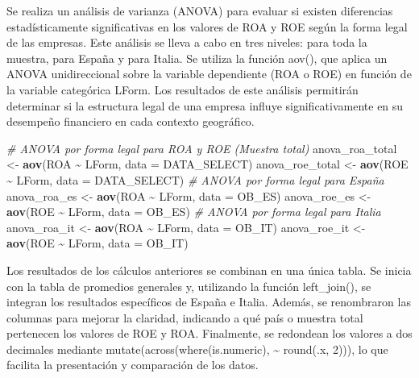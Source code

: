 \documentclass[
]{article}
\newenvironment{Shaded}{\begin{snugshade}}{\end{snugshade}}
\newcommand{\AttributeTok}[1]{\textcolor[rgb]{0.13,0.29,0.53}{#1}}
\newcommand{\CommentTok}[1]{\textcolor[rgb]{0.56,0.35,0.01}{\textit{#1}}}
\newcommand{\FunctionTok}[1]{\textcolor[rgb]{0.13,0.29,0.53}{\textbf{#1}}}
\newcommand{\NormalTok}[1]{#1}
\newcommand{\OtherTok}[1]{\textcolor[rgb]{0.56,0.35,0.01}{#1}}
\newcommand{\SpecialCharTok}[1]{\textcolor[rgb]{0.81,0.36,0.00}{\textbf{#1}}}
\begin{document}
Se realiza un análisis de varianza (ANOVA) para evaluar si existen
diferencias estadísticamente significativas en los valores de ROA y ROE
según la forma legal de las empresas. Este análisis se lleva a cabo en
tres niveles: para toda la muestra, para España y para Italia. Se
utiliza la función aov(), que aplica un ANOVA unidireccional sobre la
variable dependiente (ROA o ROE) en función de la variable categórica
LForm. Los resultados de este análisis permitirán determinar si la
estructura legal de una empresa influye significativamente en su
desempeño financiero en cada contexto geográfico.

\begin{Shaded}
\begin{Highlighting}[]
\CommentTok{\# ANOVA por forma legal para ROA y ROE (Muestra total)}
\NormalTok{anova\_roa\_total }\OtherTok{\textless{}{-}} \FunctionTok{aov}\NormalTok{(ROA }\SpecialCharTok{\textasciitilde{}}\NormalTok{ LForm, }\AttributeTok{data =}\NormalTok{ DATA\_SELECT)}
\NormalTok{anova\_roe\_total }\OtherTok{\textless{}{-}} \FunctionTok{aov}\NormalTok{(ROE }\SpecialCharTok{\textasciitilde{}}\NormalTok{ LForm, }\AttributeTok{data =}\NormalTok{ DATA\_SELECT)}
\CommentTok{\# ANOVA por forma legal para España}
\NormalTok{anova\_roa\_es }\OtherTok{\textless{}{-}} \FunctionTok{aov}\NormalTok{(ROA }\SpecialCharTok{\textasciitilde{}}\NormalTok{ LForm, }\AttributeTok{data =}\NormalTok{ OB\_ES)}
\NormalTok{anova\_roe\_es }\OtherTok{\textless{}{-}} \FunctionTok{aov}\NormalTok{(ROE }\SpecialCharTok{\textasciitilde{}}\NormalTok{ LForm, }\AttributeTok{data =}\NormalTok{ OB\_ES)}
\CommentTok{\# ANOVA por forma legal para Italia}
\NormalTok{anova\_roa\_it }\OtherTok{\textless{}{-}} \FunctionTok{aov}\NormalTok{(ROA }\SpecialCharTok{\textasciitilde{}}\NormalTok{ LForm, }\AttributeTok{data =}\NormalTok{ OB\_IT)}
\NormalTok{anova\_roe\_it }\OtherTok{\textless{}{-}} \FunctionTok{aov}\NormalTok{(ROE }\SpecialCharTok{\textasciitilde{}}\NormalTok{ LForm, }\AttributeTok{data =}\NormalTok{ OB\_IT)}
\end{Highlighting}
\end{Shaded}

Los resultados de los cálculos anteriores se combinan en una única
tabla. Se inicia con la tabla de promedios generales y, utilizando la
función left\_join(), se integran los resultados específicos de España e
Italia. Además, se renombraron las columnas para mejorar la claridad,
indicando a qué país o muestra total pertenecen los valores de ROE y
ROA. Finalmente, se redondean los valores a dos decimales mediante
mutate(across(where(is.numeric), \textasciitilde{} round(.x, 2))), lo
que facilita la presentación y comparación de los datos.
\end{document}
